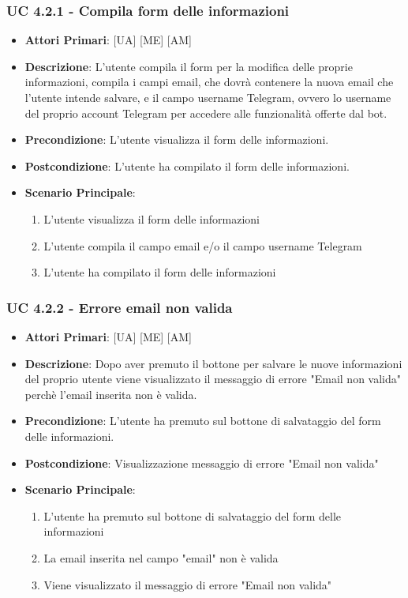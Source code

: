 			\subsubsection{UC 4.2.1 - Compila form delle informazioni}
			\begin{itemize}
				\item \textbf{Attori Primari}: [UA] [ME] [AM]
				\item \textbf{Descrizione}: L'utente compila il form per la modifica delle proprie informazioni, compila i campi email, che dovrà contenere la nuova email che l'utente intende salvare, e il campo username Telegram, ovvero lo username del proprio account Telegram per accedere alle funzionalità offerte dal bot.
				\item \textbf{Precondizione}: L'utente visualizza il form delle informazioni.
				\item \textbf{Postcondizione}: L'utente ha compilato il form delle informazioni.
				\item \textbf{Scenario Principale}:
				\begin{enumerate}
					\item{L'utente visualizza il form delle informazioni}
					\item{L'utente compila il campo email e/o il campo username Telegram}
					\item{L'utente ha compilato il form delle informazioni}
				\end{enumerate}
			\end{itemize}

			\subsubsection{UC 4.2.2 - Errore email non valida}
			\begin{itemize}
				\item \textbf{Attori Primari}: [UA] [ME] [AM]
				\item \textbf{Descrizione}: Dopo aver premuto il bottone per salvare le nuove informazioni del proprio utente viene visualizzato il messaggio di errore "Email non valida" perchè l'email inserita non è valida. 
				\item \textbf{Precondizione}: L'utente ha premuto sul bottone di salvataggio del form delle informazioni.
				\item \textbf{Postcondizione}: Visualizzazione messaggio di errore "Email non valida"
				\item \textbf{Scenario Principale}:
				\begin{enumerate}
					\item{L'utente ha premuto sul bottone di salvataggio del form delle informazioni}
					\item{La email inserita nel campo "email" non è valida}
					\item{Viene visualizzato il messaggio di errore "Email non valida"}
				\end{enumerate}	
			\end{itemize}

